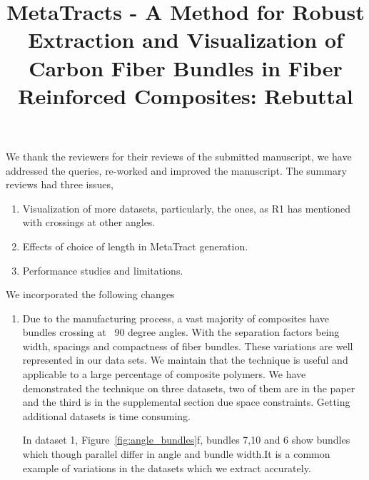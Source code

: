 \documentclass[]{article}
\title{MetaTracts - A Method for Robust Extraction and Visualization of Carbon Fiber Bundles in Fiber Reinforced Composites: Rebuttal}
\author{}
\begin{document}
\maketitle
We thank the reviewers for their reviews of the submitted manuscript, we have addressed the queries,  re-worked and improved the manuscript. The summary reviews had three issues, 
\begin{enumerate}
	   \item  Visualization of more datasets, particularly, the ones, as R1 has
	   mentioned with crossings at other angles.
	   \item Effects of choice of length in MetaTract generation.
	   \item Performance studies and limitations.
\end{enumerate}
We incorporated the following changes
\begin{enumerate}
	\item {Due to the manufacturing process, a vast majority of composites have bundles crossing at ~90 degree angles. With the separation factors being width, spacings and compactness of fiber bundles. These variations are well represented in our data sets. We maintain that the technique is useful and applicable to a large percentage of composite polymers. We have demonstrated the technique on three datasets, two of them are in the paper and the third is in the supplemental section due space  constraints. Getting additional datasets is time consuming. 
		
		In dataset 1, Figure~\ref{fig:angle_bundles}f, bundles 7,10 and 6 show  bundles which  though parallel differ in angle and bundle width.It is a common example of variations in the datasets which we extract accurately. 
		
}
\end{enumerate}
\end{document}
